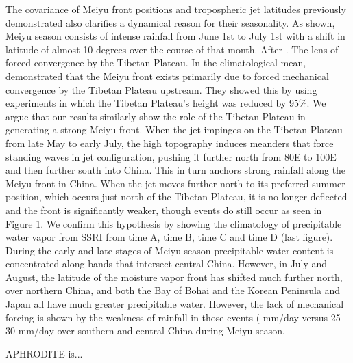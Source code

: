 \documentclass[draft,grl]{AGUTeX}
\begin{document}
\begin{article}
	The covariance of Meiyu front positions and tropospheric jet latitudes previously demonstrated also clarifies a dynamical reason for their seasonality. As shown, Meiyu season consists of intense rainfall from June 1st to July 1st with a shift in latitude of almost 10 degrees over the course of that month. After . The lens of forced convergence by the Tibetan Plateau. In the climatological mean, \cite{Chen2014} demonstrated that the Meiyu front exists primarily due to forced mechanical convergence by the Tibetan Plateau upstream. They showed this by using experiments in which the Tibetan Plateau's height was reduced by 95\%. We argue that our results similarly show the role of the Tibetan Plateau in generating a strong Meiyu front. When the jet impinges on the Tibetan Plateau from late May to early July, the high topography induces meanders that force standing waves in jet configuration, pushing it further north from 80E to 100E and then further south into China. This in turn anchors strong rainfall along the Meiyu front in China. When the jet moves further north to its preferred summer position, which occurs just north of the Tibetan Plateau, it is no longer deflected and the front is significantly weaker, though events do still occur as seen in Figure 1. We confirm this hypothesis by showing the climatology of precipitable water vapor from SSRI from time A, time B, time C and time D (last figure). During the early and late stages of Meiyu season precipitable water content is concentrated along bands that intersect central China. However, in July and August, the latitude of the moisture vapor front has shifted much further north, over northern China, and both the Bay of Bohai and the Korean Peninsula and Japan all have much greater precipitable water. However, the lack of mechanical forcing is shown by the weakness of rainfall in those events ( mm/day versus 25-30 mm/day over southern and central China during Meiyu season.


\begin{acknowledgments}
APHRODITE is... 
\end{acknowledgments}


\end{article}
\end{document}
